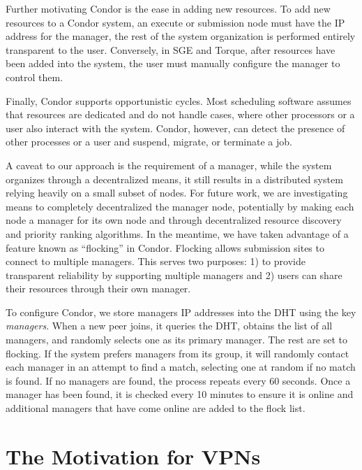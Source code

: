 \documentclass[conference]{IEEEtran}
\begin{document}
Further motivating Condor is the ease in adding new resources.  To add new
resources to a Condor system, an execute or submission node must have the IP
address for the manager, the rest of the system organization is performed
entirely transparent to the user.  Conversely, in SGE and Torque, after
resources have been added into the system, the user must manually configure the
manager to control them.

Finally, Condor supports opportunistic cycles.  Most scheduling software
assumes that resources are dedicated and do not handle cases, where other
processors or a user also interact with the system.  Condor, however, can
detect the presence of other processes or a user and suspend, migrate, or
terminate a job.

A caveat to our approach is the requirement of a manager, while the system
organizes through a decentralized means, it still results in a distributed
system relying heavily on a small subset of nodes.  For future work, we are
investigating means to completely decentralized the manager node, potentially
by making each node a manager for its own node and through decentralized
resource discovery and priority ranking algorithms.  In the meantime, we have
taken advantage of a feature known as ``flocking'' in Condor.  Flocking allows
submission sites to connect to multiple managers.  This serves two purposes: 1)
to provide transparent reliability by supporting multiple managers and 2) users
can share their resources through their own manager.  

To configure Condor, we store managers IP addresses into the DHT using the key
\emph{managers}.  When a new peer joins, it queries the DHT, obtains the list
of all managers, and randomly selects one as its primary manager.  The rest are
set to flocking.  If the system prefers managers from its group, it will
randomly contact each manager in an attempt to find a match, selecting one at
random if no match is found.  If no managers are found, the process repeats
every 60 seconds.  Once a manager has been found, it is checked every 10
minutes to ensure it is online and additional managers that have come online
are added to the flock list.

\section{The Motivation for VPNs}
\label{vpns}
\end{document}
